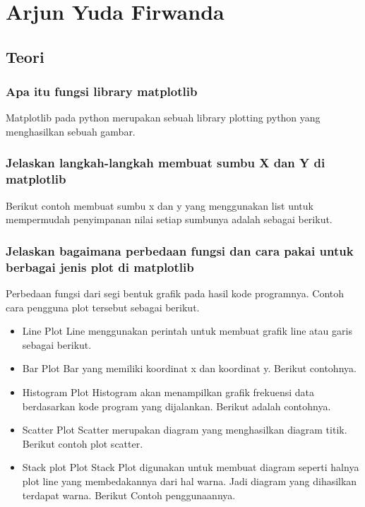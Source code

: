 \section{Arjun Yuda Firwanda}
\subsection{Teori}
\subsubsection{Apa itu fungsi library matplotlib}
\hfill \break
Matplotlib pada python merupakan sebuah library plotting python yang menghasilkan sebuah gambar.

\subsubsection{Jelaskan langkah-langkah membuat sumbu X dan Y di matplotlib}
\hfill \break
Berikut contoh membuat sumbu x dan y yang menggunakan list untuk mempermudah penyimpanan nilai setiap sumbunya adalah sebagai berikut.


\subsubsection{Jelaskan bagaimana perbedaan fungsi dan cara pakai untuk berbagai jenis plot di matplotlib}
\hfill \break
Perbedaan fungsi dari segi bentuk grafik pada hasil kode programnya.
Contoh cara pengguna plot tersebut sebagai berikut.
\begin{itemize}
    \item Line
    Plot Line menggunakan perintah untuk membuat grafik line atau garis sebagai berikut.
    

    \item Bar
    Plot Bar yang memiliki koordinat x dan koordinat y. Berikut contohnya.
    

    \item Histogram
    Plot Histogram akan menampilkan grafik frekuensi data berdasarkan kode program yang dijalankan.
    Berikut adalah contohnya.
    

    \item Scatter
    Plot Scatter merupakan diagram yang menghasilkan diagram titik.
    Berikut contoh plot scatter.
    

    \item Stack plot
    Plot Stack Plot digunakan untuk membuat diagram seperti halnya plot line yang membedakannya dari hal warna. Jadi diagram yang dihasilkan terdapat warna.
    Berikut Contoh penggunaannya.
    
\end{itemize}

